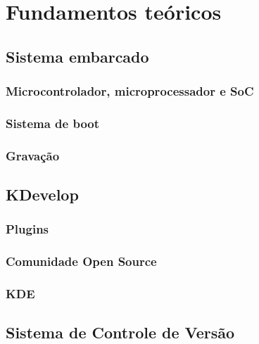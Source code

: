 \chapter{Fundamentos teóricos}
\lipsum[1-4]

\section{Sistema embarcado}
\lipsum[1-4]

\subsection{Microcontrolador, microprocessador e SoC}
\lipsum[1-4]

\subsection{Sistema de boot}
\lipsum[1-4]

\subsection{Gravação}
\lipsum[1-4]

\section{KDevelop}
\lipsum[1-4]

\subsection{Plugins}
\lipsum[1-4]

\subsection{Comunidade Open Source}
\lipsum[1-4]

\subsection{KDE}
\lipsum[1-4]

\section{Sistema de Controle de Versão}
\lipsum[1-4]
